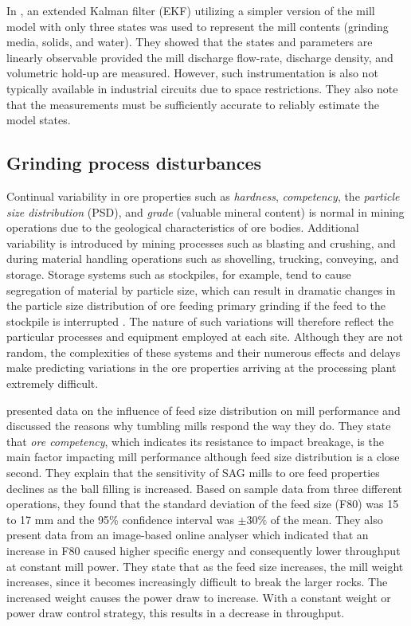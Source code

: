 In \cite{le_roux_ekf_2017}, an extended Kalman filter (\gls{EKF}) utilizing a simpler version of the mill model with only three states was used to represent the mill contents (grinding media, solids, and water). They showed that the states and parameters are linearly observable provided the mill discharge flow-rate, discharge density, and volumetric hold-up are measured. However, such instrumentation is also not typically available in industrial circuits due to space restrictions. They also note that the measurements must be sufficiently accurate to reliably estimate the model states.

\subsection{Grinding process disturbances}

Continual variability in ore properties such as \textit{hardness}, \textit{competency}, the \textit{particle size distribution} (\gls{PSD}), and \textit{grade} (valuable mineral content) is normal in mining operations due to the geological characteristics of ore bodies. Additional variability is introduced by mining processes such as blasting and crushing, and during material handling operations such as shovelling, trucking, conveying, and storage. Storage systems such as stockpiles, for example, tend to cause segregation of material by particle size, which can result in dramatic changes in the particle size distribution of ore feeding primary grinding if the feed to the stockpile is interrupted \citep{estrada_hybrid_2014}. The nature of such variations will therefore reflect the particular processes and equipment employed at each site. Although they are not random, the complexities of these systems and their numerous effects and delays make predicting variations in the ore properties arriving at the processing plant extremely difficult.

\cite{morrell_influence_2001} presented data on the influence of feed size distribution on mill performance and discussed the reasons why tumbling mills respond the way they do. They state that \textit{ore competency}, which indicates its resistance to impact breakage, is the main factor impacting mill performance although feed size distribution is a close second. They explain that the sensitivity of \acrshort{SAG} mills to ore feed properties declines as the ball filling is increased. Based on sample data from three different operations, they found that the standard deviation of the feed size (F80) was 15 to 17 mm and the 95\% confidence interval was $\pm30\text{\%}$ of the mean. They also present data from an image-based online analyser which indicated that an increase in F80 caused higher specific energy and consequently lower throughput at constant mill power. They state that as the feed size increases, the mill weight increases, since it becomes increasingly difficult to break the larger rocks. The increased weight causes the power draw to increase. With a constant weight or power draw control strategy, this results in a decrease in throughput.

